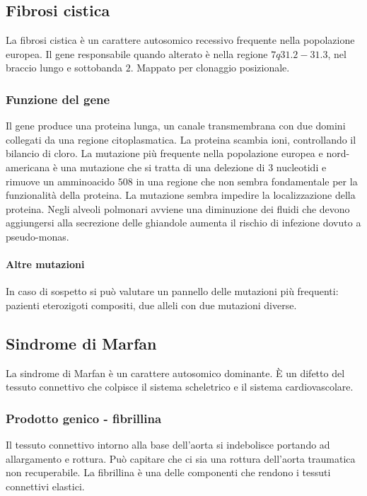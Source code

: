 	\subsection{Fibrosi cistica}
	La fibrosi cistica \`e un carattere autosomico recessivo frequente nella popolazione europea.
	Il gene responsabile quando alterato \`e nella regione $7q31.2-31.3$, nel braccio lungo e sottobanda $2$. 
	Mappato per clonaggio posizionale.

		\subsubsection{Funzione del gene}
		Il gene produce una proteina lunga, un canale transmembrana con due domini collegati da una regione citoplasmatica.
		La proteina scambia ioni, controllando il bilancio di cloro.
		La mutazione pi\`u frequente nella popolazione europea e nord-americana \`e una mutazione che si tratta di una delezione di $3$ nucleotidi e rimuove un amminoacido $508$ in una regione che
		non sembra fondamentale per la funzionalit\`a della proteina. 
		La mutazione sembra impedire la localizzazione della proteina.
		Negli alveoli polmonari avviene una diminuzione dei fluidi che devono aggiungersi alla secrezione delle ghiandole aumenta il rischio di infezione dovuto a pseudo-monas. 


		\paragraph{Altre mutazioni}
		In caso di sospetto si pu\`o valutare un pannello delle mutazioni pi\`u frequenti: pazienti eterozigoti compositi, due alleli con due mutazioni diverse.

	\subsection{Sindrome di Marfan}
	La sindrome di Marfan \`e un carattere autosomico dominante. 
	\`E un difetto del tessuto connettivo che colpisce il sistema scheletrico e il sistema cardiovascolare.

		\subsubsection{Prodotto genico - fibrillina}
		Il tessuto connettivo intorno alla base dell'aorta si indebolisce portando ad allargamento e rottura. 
		Pu\`o capitare che ci sia una rottura dell'aorta traumatica non recuperabile.
		La fibrillina \`e una delle componenti che rendono i tessuti connettivi elastici.
		
